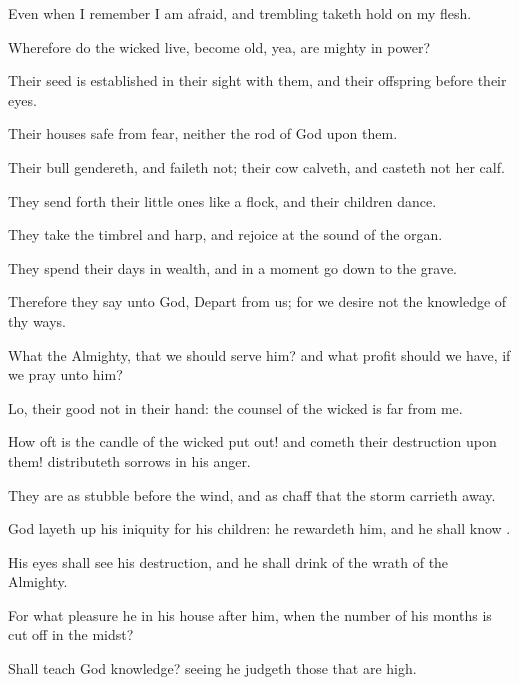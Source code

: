 {Even when I
remember I am
afraid, and
trembling taketh hold
on my
flesh.


\par }{\PP {}Wherefore do the
wicked
live, become
old, yea, are
mighty in
power?

Their
seed is
established in their
sight with them, and their
offspring before their
eyes.

Their
houses
{}
safe from
fear, neither
{} the
rod of
God upon them.

Their
bull
gendereth, and
faileth not; their
cow
calveth, and casteth not her
calf.

They send
forth their little
ones like a
flock, and their
children
dance.

They
take the
timbrel and
harp, and
rejoice at the
sound of the
organ.

They
spend their
days in
wealth, and in a
moment go
down to the
grave.

Therefore they
say unto
God,
Depart from us; for we
desire not the
knowledge of thy
ways.

What
{} the
Almighty, that we should
serve him? and what
profit should we have, if we
pray unto him?

Lo, their
good
{} not in their
hand: the
counsel of the
wicked is
far from me.


\par }{\PP {}How oft is the
candle of the
wicked put
out! and
{}
cometh their
destruction upon them!
{}
distributeth
sorrows in his
anger.

They are as
stubble
before the
wind, and as
chaff that the
storm carrieth
away.

God layeth
up his
iniquity for his
children: he
rewardeth him, and he shall
know
{}.

His
eyes shall
see his
destruction, and he shall
drink of the
wrath of the
Almighty.

For what
pleasure
{} he in his
house
after him, when the
number of his
months is cut off in the
midst?

Shall
{}
teach
God
knowledge? seeing he
judgeth those that are
high.

}
